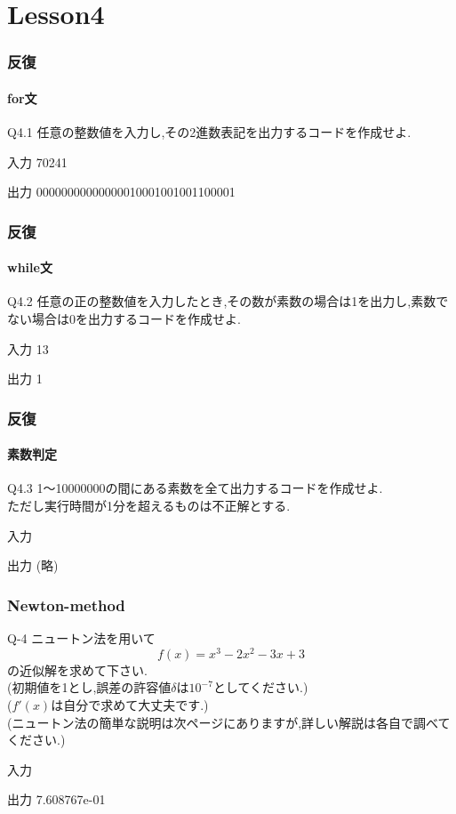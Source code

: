 \documentclass[dvipdfmx]{beamer}
\begin{document}
\section{Lesson4}
\begin{frame}
    \frametitle{反復}
    \framesubtitle{for文}
	\begin{itembox}[l]{Q4.1}
        任意の整数値を入力し,その2進数表記を出力するコードを作成せよ.
	\end{itembox}
	\begin{block}{入力}
        70241
	\end{block}
	\begin{block}{出力}
        00000000000000010001001001100001
	\end{block}
\end{frame}

\begin{frame}
    \frametitle{反復}
    \framesubtitle{while文}
	\begin{itembox}[l]{Q4.2}
        任意の正の整数値を入力したとき,その数が素数の場合は1を出力し,素数でない場合は0を出力するコードを作成せよ.
	\end{itembox}
	\begin{block}{入力}
        13
	\end{block}
	\begin{block}{出力}
        1
	\end{block}
\end{frame}

\begin{frame}
    \frametitle{反復}
    \framesubtitle{素数判定}
	\begin{itembox}[l]{Q4.3}
        1～10000000の間にある素数を全て出力するコードを作成せよ.\\
        ただし実行時間が1分を超えるものは不正解とする.
	\end{itembox}
	\begin{block}{入力}
	\end{block}
	\begin{block}{出力}
        (略)
	\end{block}
\end{frame}

\begin{frame}
	\frametitle{Newton-method}
	\begin{itembox}[l]{Q-4}
		ニュートン法を用いて
		$$f(x) = x^3-2x^2-3x+3$$
		の近似解を求めて下さい.\\
		(初期値を1とし,誤差の許容値$\delta$は$10^{-7}$としてください.)\\
		($f'(x)$は自分で求めて大丈夫です.)\\
		(ニュートン法の簡単な説明は次ページにありますが,詳しい解説は各自で調べてください.)
	\end{itembox}
	\begin{block}{入力}		
	\end{block}
	\begin{block}{出力}
		7.608767e-01
	\end{block}
\end{frame}
\end{document}
